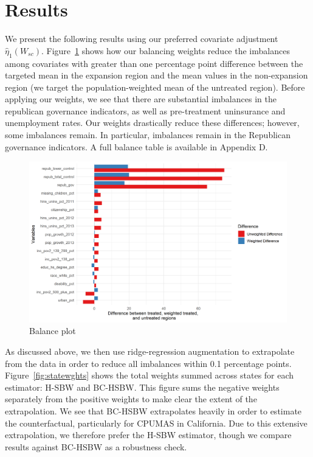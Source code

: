 \documentclass[12pt]{article}
\begin{document}
\section{Results}

We present the following results using our preferred covariate adjustment $\hat{\eta}_1(W_{sc})$.  Figure~\ref{fig:loveplot} shows how our balancing weights reduce the imbalances among covariates with greater than one percentage point difference between the targeted mean in the expansion region and the mean values in the non-expansion region (we target the population-weighted mean of the untreated region). Before applying our weights, we see that there are substantial imbalances in the republican governance indicators, as well as pre-treatment uninsurance and unemployment rates. Our weights drastically reduce these differences; however, some imbalances remain. In particular, imbalances remain in the Republican governance indicators. A full balance table is available in Appendix D. 

\begin{figure}[B]
\begin{center}
    \includegraphics[scale=0.6]{01_Plots/balance-plot-etu.png}
    \caption{Balance plot}
    \label{fig:loveplot}
\end{center}
\end{figure}

As discussed above, we then use ridge-regression augmentation to extrapolate from the data in order to reduce all imbalances within 0.1 percentage points. Figure~\ref{fig:statewghts} shows the total weights summed across states for each estimator: H-SBW and BC-HSBW. This figure sums the negative weights separately from the positive weights to make clear the extent of the extrapolation. We see that BC-HSBW extrapolates heavily in order to estimate the counterfactual, particularly for CPUMAS in California. Due to this extensive extrapolation, we therefore prefer the H-SBW estimator, though we compare results against BC-HSBW as a robustness check.
\end{document}
